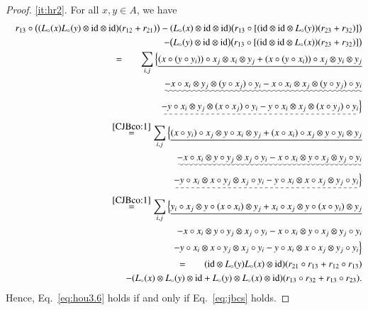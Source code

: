 \documentclass[12pt, reqno, a4paper]{amsart}
\theoremstyle{definition}
\newcommand{\id}{\mathrm{id}}
\begin{document}
\begin{proof}
	\ref{it:hr2}. For all $x,y \in A$, we have
	\begin{eqnarray*}
		&&r_{13} \circ \bigl( (L_{\circ}(x) L_{\circ}(y) \otimes \id \otimes \id )(r_{12} + r_{21}) \bigr) - (L_{\circ}(x) \otimes \id \otimes \id) \bigl( r_{13} \circ [(\id \otimes \id \otimes L_{\circ}(y))(r_{23} + r_{32})] \bigr) \notag\\
		&&\quad - \bigl( L_{\circ}(y) \otimes \id \otimes \id \bigr) \bigl( r_{13} \circ [(\id \otimes \id \otimes L_{\circ}(x))(r_{23} + r_{32})] \bigr) \\
		&&\overset{\hphantom{\eqref{CJBco:1}}}{=} \sum_{i,j} \Big\{ \uline{ (x \circ (y \circ y_i)) \circ x_j \otimes x_i \otimes y_j + (x \circ (y \circ x_i)) \circ x_j \otimes y_i \otimes y_j } \\
		&&\quad \uwave{ - x \circ x_i \otimes y_j \otimes (y \circ x_j) \circ y_i - x \circ x_i \otimes x_j \otimes (y \circ y_j) \circ y_i } \\
		&&\quad \dashuline{ - y \circ x_i \otimes y_j \otimes (x \circ x_j) \circ y_i - y \circ x_i \otimes x_j \otimes (x \circ y_j) \circ y_i} \Big\} \\
		&&\overset{\eqref{CJBco:1}}{=} \sum_{i,j} \Big\{ \uline{ (x \circ y_i) \circ x_j \otimes y \circ x_i \otimes y_j + (x \circ x_i) \circ x_j \otimes y \circ y_i \otimes y_j } \\
		&&\quad \uwave{- x \circ x_i \otimes y \circ y_j \otimes x_j \circ y_i - x \circ x_i \otimes y \circ x_j \otimes y_j \circ y_i } \\
		&&\quad \dashuline{ - y \circ x_i \otimes x \circ y_j \otimes x_j \circ y_i - y \circ x_i \otimes x \circ x_j \otimes y_j \circ y_i } \Big\} \\
		&&\overset{\eqref{CJBco:1}}{=} \sum_{i,j} \Big\{ \uline{ y_i \circ x_j \otimes y \circ (x \circ x_i) \otimes y_j + x_i \circ x_j \otimes y \circ (x \circ y_i) \otimes y_j} \\
		&&\quad - x \circ x_i \otimes y \circ y_j \otimes x_j \circ y_i - x \circ x_i \otimes y \circ x_j \otimes y_j \circ y_i \\
		&&\quad - y \circ x_i \otimes x \circ y_j \otimes x_j \circ y_i - y \circ x_i \otimes x \circ x_j \otimes y_j \circ y_i \Big\} \\
		&&\overset{\hphantom{\eqref{CJBco:1}}}{=} (\id \otimes L_{\circ}(y)L_{\circ}(x) \otimes \id)( r_{21} \circ r_{13} + r_{12} \circ r_{13}) \\
		&&\quad -(L_{\circ}(x) \otimes L_{\circ}(y) \otimes \id + L_{\circ}(y)\otimes L_{\circ}(x) \otimes \id)(r_{13} \circ r_{32} + r_{13} \circ r_{23}).
	\end{eqnarray*}
	Hence, Eq.~\eqref{eq:hou3.6} holds if and only if Eq.~\eqref{eq:jbcs} holds.
\end{proof}
\end{document}
